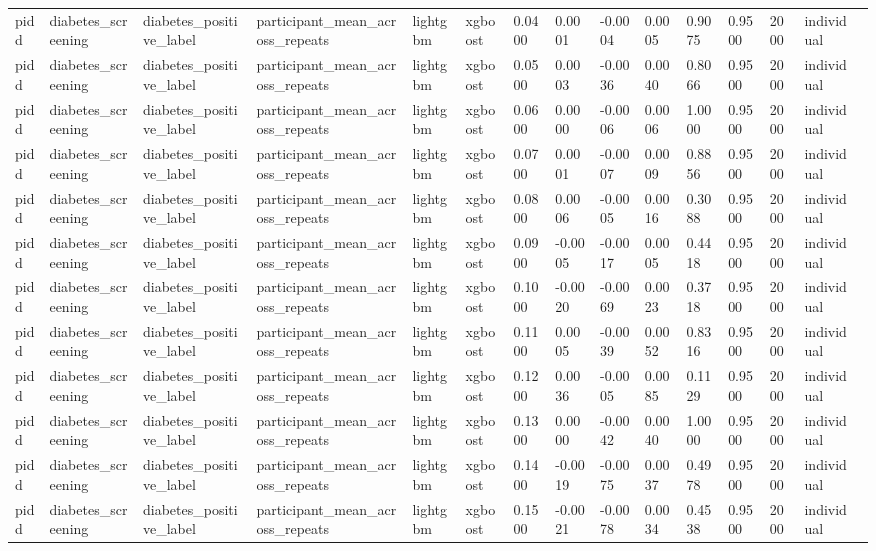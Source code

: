 \begin{tabular}{lllllllllllllll}
pidd & diabetes\_screening & diabetes\_positive\_label & participant\_mean\_across\_repeats & lightgbm & xgboost & 0.0400 & 0.0001 & -0.0004 & 0.0005 & 0.9075 & 0.9500 & 2000 & individual &  \\
pidd & diabetes\_screening & diabetes\_positive\_label & participant\_mean\_across\_repeats & lightgbm & xgboost & 0.0500 & 0.0003 & -0.0036 & 0.0040 & 0.8066 & 0.9500 & 2000 & individual &  \\
pidd & diabetes\_screening & diabetes\_positive\_label & participant\_mean\_across\_repeats & lightgbm & xgboost & 0.0600 & 0.0000 & -0.0006 & 0.0006 & 1.0000 & 0.9500 & 2000 & individual &  \\
pidd & diabetes\_screening & diabetes\_positive\_label & participant\_mean\_across\_repeats & lightgbm & xgboost & 0.0700 & 0.0001 & -0.0007 & 0.0009 & 0.8856 & 0.9500 & 2000 & individual &  \\
pidd & diabetes\_screening & diabetes\_positive\_label & participant\_mean\_across\_repeats & lightgbm & xgboost & 0.0800 & 0.0006 & -0.0005 & 0.0016 & 0.3088 & 0.9500 & 2000 & individual &  \\
pidd & diabetes\_screening & diabetes\_positive\_label & participant\_mean\_across\_repeats & lightgbm & xgboost & 0.0900 & -0.0005 & -0.0017 & 0.0005 & 0.4418 & 0.9500 & 2000 & individual &  \\
pidd & diabetes\_screening & diabetes\_positive\_label & participant\_mean\_across\_repeats & lightgbm & xgboost & 0.1000 & -0.0020 & -0.0069 & 0.0023 & 0.3718 & 0.9500 & 2000 & individual &  \\
pidd & diabetes\_screening & diabetes\_positive\_label & participant\_mean\_across\_repeats & lightgbm & xgboost & 0.1100 & 0.0005 & -0.0039 & 0.0052 & 0.8316 & 0.9500 & 2000 & individual &  \\
pidd & diabetes\_screening & diabetes\_positive\_label & participant\_mean\_across\_repeats & lightgbm & xgboost & 0.1200 & 0.0036 & -0.0005 & 0.0085 & 0.1129 & 0.9500 & 2000 & individual &  \\
pidd & diabetes\_screening & diabetes\_positive\_label & participant\_mean\_across\_repeats & lightgbm & xgboost & 0.1300 & 0.0000 & -0.0042 & 0.0040 & 1.0000 & 0.9500 & 2000 & individual &  \\
pidd & diabetes\_screening & diabetes\_positive\_label & participant\_mean\_across\_repeats & lightgbm & xgboost & 0.1400 & -0.0019 & -0.0075 & 0.0037 & 0.4978 & 0.9500 & 2000 & individual &  \\
pidd & diabetes\_screening & diabetes\_positive\_label & participant\_mean\_across\_repeats & lightgbm & xgboost & 0.1500 & -0.0021 & -0.0078 & 0.0034 & 0.4538 & 0.9500 & 2000 & individual &  \\

\end{tabular}
